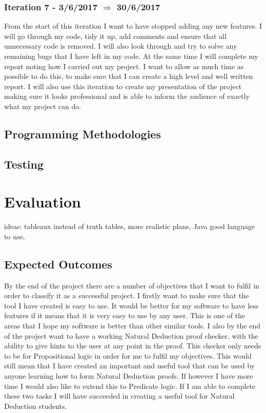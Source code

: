 \subsubsection{Iteration 7 - 3/6/2017 $\Rightarrow$ 30/6/2017}

From the start of this iteration I want to have stopped adding any new features. I will go through my code, tidy it up, add comments and ensure that all unnecessary code is removed. I will also look through and try to solve any remaining bugs that I have left in my code. At the same time I will complete my report noting how I carried out my project. I want to allow as much time as possible to do this, to make sure that I can create a high level and well written report. I will also use this iteration to create my presentation of the project making sure it looks professional and is able to inform the audience of exactly what my project can do.

\subsection{Programming Methodologies}

\subsection{Testing}


\section{Evaluation}

ideas: tableaux instead of truth tables, more realistic plans, Java good language to use, 
\subsection{Expected Outcomes}

By the end of the project there are a number of objectives that I want to fulfil in order to classify it as a successful project. I firstly want to make sure that the tool I have created is easy to use. It would be better for my software to have less features if it means that it is very easy to use by any user. This is one of the areas that I hope my software is better than other similar tools. I also by the end of the project want to have a working Natural Deduction proof checker, with the ability to give hints to the user at any point in the proof. This checker only needs to be for Propositional logic in order for me to fulfil my objectives. This would still mean that I have created an important and useful tool that can be used by anyone learning how to form Natural Deduction proofs. If however I have more time I would also like to extend this to Predicate logic. If I am able to complete these two tasks I will have succeeded in creating a useful tool for Natural Deduction students.

